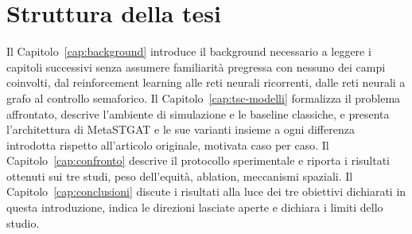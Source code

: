 \section{Struttura della tesi}

Il Capitolo~\ref{cap:background} introduce il background necessario a
leggere i capitoli successivi senza assumere familiarità pregressa con
nessuno dei campi coinvolti, dal reinforcement learning alle reti neurali
ricorrenti, dalle reti neurali a grafo al controllo semaforico. Il
Capitolo~\ref{cap:tsc-modelli} formalizza il problema affrontato,
descrive l'ambiente di simulazione e le baseline classiche, e presenta
l'architettura di MetaSTGAT e le sue varianti insieme a ogni differenza
introdotta rispetto all'articolo originale, motivata caso per caso. Il
Capitolo~\ref{cap:confronto} descrive il protocollo sperimentale e
riporta i risultati ottenuti sui tre studi, peso dell'equità, ablation,
meccanismi spaziali. Il Capitolo~\ref{cap:conclusioni} discute i
risultati alla luce dei tre obiettivi dichiarati in questa introduzione,
indica le direzioni lasciate aperte e dichiara i limiti dello studio.

